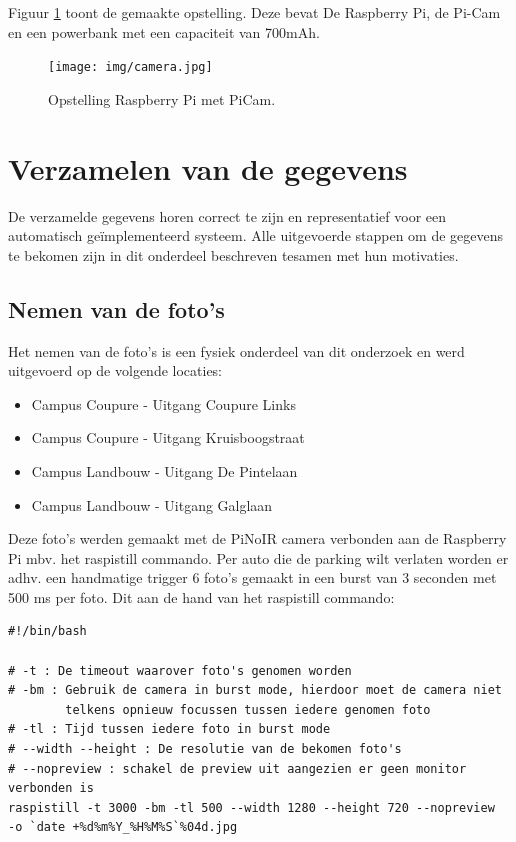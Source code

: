Figuur \ref{Opstelling} toont de gemaakte opstelling. Deze bevat De Raspberry Pi, de Pi-Cam en een powerbank met een capaciteit van 700mAh.
\begin{figure}[h]
	\centering
	\texttt{[image: img/camera.jpg]}
	\caption{Opstelling Raspberry Pi met PiCam.}
	\label{Opstelling}
\end{figure}

\section{Verzamelen van de gegevens}
De verzamelde gegevens horen correct te zijn en representatief voor een automatisch geïmplementeerd systeem. Alle uitgevoerde stappen om de gegevens te bekomen zijn in dit onderdeel beschreven tesamen met hun motivaties.

\subsection{Nemen van de foto's}
Het nemen van de foto's is een fysiek onderdeel van dit onderzoek en werd uitgevoerd op de volgende locaties:
\begin{itemize}
	\item Campus Coupure - Uitgang Coupure Links
	\item Campus Coupure - Uitgang Kruisboogstraat
	\item Campus Landbouw - Uitgang De Pintelaan
	\item Campus Landbouw - Uitgang Galglaan
\end{itemize}

Deze foto's werden gemaakt met de PiNoIR camera verbonden aan de Raspberry Pi mbv. het raspistill commando. Per auto die de parking wilt verlaten worden er adhv. een handmatige trigger 6 foto's gemaakt in een burst van 3 seconden met 500 ms per foto. Dit aan de hand van het raspistill commando:  
\begin{verbatim}
#!/bin/bash

# -t : De timeout waarover foto's genomen worden
# -bm : Gebruik de camera in burst mode, hierdoor moet de camera niet 
        telkens opnieuw focussen tussen iedere genomen foto
# -tl : Tijd tussen iedere foto in burst mode
# --width --height : De resolutie van de bekomen foto's
# --nopreview : schakel de preview uit aangezien er geen monitor verbonden is
raspistill -t 3000 -bm -tl 500 --width 1280 --height 720 --nopreview
-o `date +%d%m%Y_%H%M%S`%04d.jpg
\end{verbatim}

